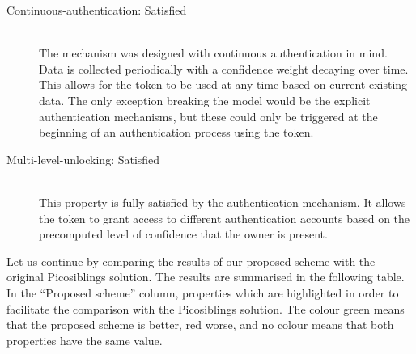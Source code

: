 \begin{description}
  \item[Continuous-authentication: Satisfied] \hfill \\
  The mechanism was designed with continuous authentication in mind. Data is collected periodically with a confidence weight decaying over time. This allows for the token to be used at any time based on current existing data. The only exception breaking the model would be the explicit authentication mechanisms, but these could only be triggered at the beginning of an authentication process using the token.
  
  \item[Multi-level-unlocking: Satisfied] \hfill \\
  This property is fully satisfied by the authentication mechanism. It allows the token to grant access to different authentication accounts based on the precomputed level of confidence that the owner is present. 
  
\end{description}

Let us continue by comparing the results of our proposed scheme with the original Picosiblings solution. The results are summarised in the following table. In the ``Proposed scheme'' column, properties which are highlighted in order to facilitate the comparison with the Picosiblings solution. The colour green means that the proposed scheme is better, red worse, and no colour means that both properties have the same value.

